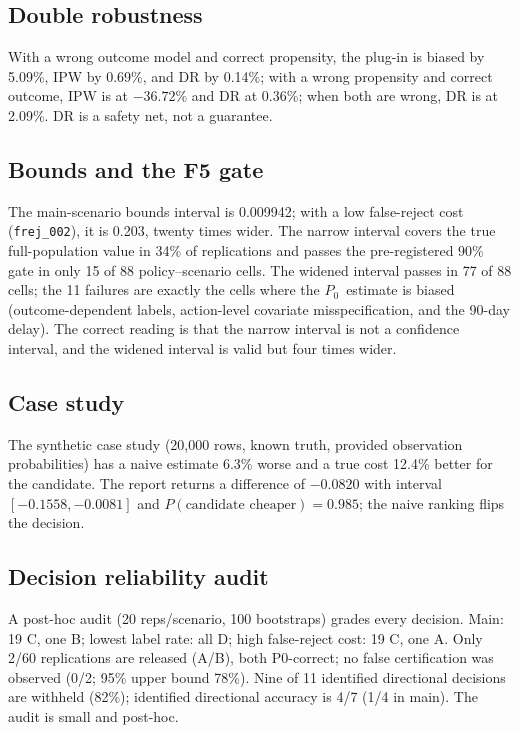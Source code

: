 \documentclass[conference]{IEEEtran}
\newcommand{\Pzero}{\ensuremath{P_0}}
\begin{document}
\subsection{Double robustness}
With a wrong outcome model and correct propensity, the plug-in is biased by 5.09\%, IPW by 0.69\%, and DR by 0.14\%; with a wrong propensity and correct outcome, IPW is at $-36.72$\% and DR at 0.36\%; when both are wrong, DR is at 2.09\%. DR is a safety net, not a guarantee.

\subsection{Bounds and the F5 gate}
The main-scenario bounds interval is 0.009942; with a low false-reject cost (\texttt{frej\_002}), it is 0.203, twenty times wider. The narrow interval covers the true full-population value in 34\% of replications and passes the pre-registered 90\% gate in only 15 of 88 policy--scenario cells. The widened interval passes in 77 of 88 cells; the 11 failures are exactly the cells where the \Pzero\ estimate is biased (outcome-dependent labels, action-level covariate misspecification, and the 90-day delay). The correct reading is that the narrow interval is not a confidence interval, and the widened interval is valid but four times wider.

\subsection{Case study}
The synthetic case study (20,000 rows, known truth, provided observation probabilities) has a naive estimate 6.3\% worse and a true cost 12.4\% better for the candidate. The report returns a difference of $-0.0820$ with interval $[-0.1558,-0.0081]$ and $P(\text{candidate cheaper})=0.985$; the naive ranking flips the decision.

\subsection{Decision reliability audit}
A post-hoc audit (20 reps/scenario, 100 bootstraps) grades every decision. Main: 19 C, one B; lowest label rate: all D; high false-reject cost: 19 C, one A. Only 2/60 replications are released (A/B), both P0-correct; no false certification was observed (0/2; 95\% upper bound 78\%). Nine of 11 identified directional decisions are withheld (82\%); identified directional accuracy is 4/7 (1/4 in main). The audit is small and post-hoc.
\end{document}
